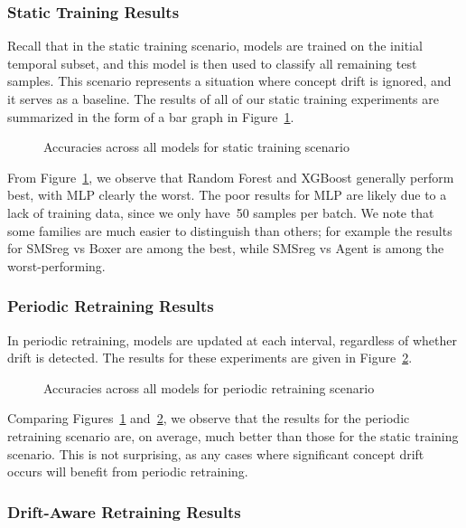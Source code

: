 \documentclass[12pt]{article}
\begin{document}
\subsubsection{Static Training Results}

Recall that in the static training scenario, models are trained on the initial temporal subset,
and this model is then used to classify all remaining test samples.
This scenario represents a situation where concept drift is ignored, and it
serves as a baseline. The results of all of our static training experiments are 
summarized in the form of a bar graph in Figure~\ref{fig:caseA_All}. 

\begin{figure}[!htb]
    \centering
    
    \caption{Accuracies across all models for static training scenario}\label{fig:caseA_All}
\end{figure}

From Figure~\ref{fig:caseA_All},
we observe that Random Forest and XGBoost 
generally perform best, with MLP clearly the worst.
The poor results for MLP are likely due to a lack of training data,
since we only have~50 samples per batch.
We note that some families are much easier to distinguish
than others; for example the results for SMSreg vs Boxer are
among the best, while SMSreg vs Agent is among the worst-performing.

\subsubsection{Periodic Retraining Results}

In periodic retraining, models are updated at each interval, 
regardless of whether drift is detected. The results for these experiments
are given in Figure~\ref{fig:caseB_All}.

\begin{figure}[!htb]
    \centering
    
    \caption{Accuracies across all models for periodic retraining scenario}\label{fig:caseB_All}
\end{figure}

Comparing Figures~\ref{fig:caseA_All} and~\ref{fig:caseB_All}, 
we observe that the results for the periodic retraining scenario
are, on average, much better than those for the static training scenario.
This is not surprising, as any cases where significant concept drift occurs
will benefit from periodic retraining.

\subsubsection{Drift-Aware Retraining Results}
\end{document}
